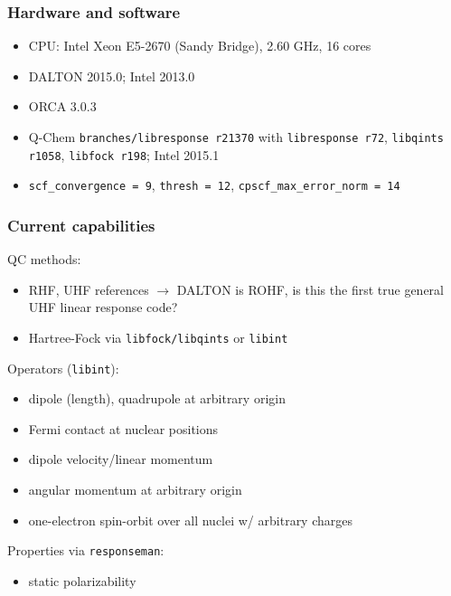 \documentclass[%
    xcolor=usenames,dvipsnames,svgnames%
]{beamer}
\begin{document}
\begin{frame}
  \frametitle{Hardware and software}
  \begin{itemize}
  \item CPU: Intel Xeon E5-2670 (Sandy Bridge), 2.60 GHz, 16 cores
  \item DALTON 2015.0; Intel 2013.0
  \item ORCA 3.0.3
  \item Q-Chem \texttt{branches/libresponse r21370} with \texttt{libresponse r72}, \texttt{libqints r1058}, \texttt{libfock r198}; Intel 2015.1
  \item \texttt{scf\_convergence = 9}, \texttt{thresh = 12}, \texttt{cpscf\_max\_error\_norm = 14}
  \end{itemize}
\end{frame}

\begin{frame}
  \frametitle{Current capabilities}
  QC methods:
  \begin{itemize}
  \item RHF, UHF references \(\rightarrow\) DALTON is ROHF, is this the first true general UHF linear response code?
  \item Hartree-Fock via \texttt{libfock/libqints} or \texttt{libint}
  \end{itemize}
  Operators (\texttt{libint}):
  \begin{itemize}
  \item dipole (length), quadrupole at arbitrary origin
  \item Fermi contact at nuclear positions
  \item dipole velocity/linear momentum
  \item angular momentum at arbitrary origin
  \item one-electron spin-orbit over all nuclei w/ arbitrary charges
  \end{itemize}
  Properties via \texttt{responseman}:
  \begin{itemize}
  \item static polarizability
  \end{itemize}
\end{frame}
\end{document}
